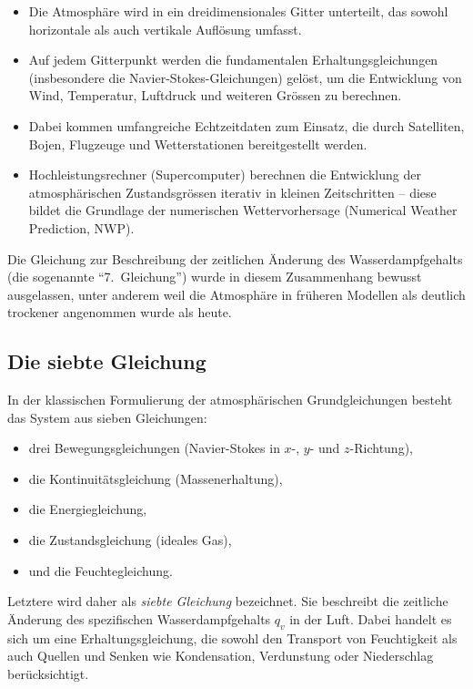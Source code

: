 \begin{itemize}
    \item Die Atmosphäre wird in ein dreidimensionales Gitter unterteilt, das sowohl horizontale als auch vertikale Auflösung umfasst.
    \item Auf jedem Gitterpunkt werden die fundamentalen Erhaltungsgleichungen (insbesondere die Navier-Stokes-Gleichungen) gelöst, um die Entwicklung von Wind, Temperatur, Luftdruck und weiteren Grössen zu berechnen.
    \item Dabei kommen umfangreiche Echtzeitdaten zum Einsatz, die durch Satelliten, Bojen, Flugzeuge und Wetterstationen bereitgestellt werden.
%
%
%
%
%
    \item Hochleistungsrechner (Supercomputer) berechnen die Entwicklung der atmosphärischen Zustandsgrössen iterativ in kleinen Zeitschritten – diese bildet die Grundlage der numerischen Wettervorhersage (Numerical Weather Prediction, NWP).
%
%
%
%
\end{itemize}

Die Gleichung zur Beschreibung der zeitlichen Änderung des Wasserdampfgehalts (die sogenannte ``7.~Gleichung'') wurde in diesem Zusammenhang bewusst ausgelassen, unter anderem weil die Atmosphäre in früheren Modellen als deutlich trockener angenommen wurde als heute.
%

\subsection{Die siebte Gleichung}

In der klassischen Formulierung der atmosphärischen Grundgleichungen besteht das System aus sieben Gleichungen:  
\begin{itemize}
    \item drei Bewegungsgleichungen (Navier-Stokes in $x$-, $y$- und $z$-Richtung),
    \item die Kontinuitätsgleichung (Massenerhaltung),
    \item die Energiegleichung,
    \item die Zustandsgleichung (ideales Gas),
    \item und die Feuchtegleichung.
\end{itemize}

Letztere wird daher als \emph{siebte Gleichung} bezeichnet. Sie beschreibt die zeitliche Änderung des spezifischen Wasserdampfgehalts $q_v$ in der Luft. Dabei handelt es sich um eine Erhaltungsgleichung, die sowohl den Transport von Feuchtigkeit als auch Quellen und Senken wie Kondensation, Verdunstung oder Niederschlag berücksichtigt.  

